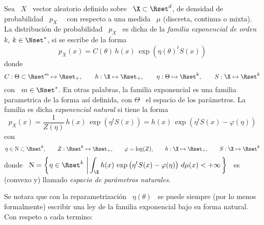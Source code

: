\begin{definicion}\label{Def:MP:FamiliaExponencial}
%
  Sea  \ $X$  \  vector aleatorio  definido  sobre \  $\X  \subset \Rset^d$,  de
  densidad  de probabilidad  \  $p_X$ \  \ con  respecto  a una  medida \  $\mu$
  (discreta, continua o  mixta). La distribuci\'on de probabilidad  \ $p_X$ \ es
  dicha de  la {\em familia  exponencial de orden  $k$}, $k \in \Nset^*$,  si se
  escribe de la forma
  \[
  p_X(x) = C(\theta) \, h(x) \, \exp\left( \eta(\theta)^t S(x) \right)
  \]
  donde
  \[
  C:  \Theta \subset  \Rset^m \mapsto  \Rset_+,  \qquad h:  \X \mapsto  \Rset_+,
  \qquad \eta: \Theta \mapsto \Rset^k, \qquad S: \X \mapsto \Rset^k
  \]
  con  \ $m  \in \Nset^*$.   En otras  palabras, la  familia exponencial  es una
  familia parametrica de  la forma as\'i definida, con $\Theta$  \ el espacio de
  los par\'ametros.  La familia es dicha  {\em exponencial natural}  si tiene la
  forma
  \[
  p_X(x) = \frac{1}{Z(\eta)}  \, h(x) \, \exp\left( \eta^t  S(x) \right) = h(x)
  \, \exp\left( \eta^t S(x) - \varphi(\eta) \right)
  \]
  con
  \[
  \eta \in \mathrm{N} \subset \Rset^k, \qquad Z: \Rset^k \mapsto \Rset_+, \qquad
  \varphi = \log(Z), \qquad h: \X \mapsto \Rset_+, \qquad S: \X \mapsto \Rset^k
  \]
  donde  \ $\displaystyle \mathrm{N}  = \left\{  \eta \in  \Rset^k \,  \left| \,
      \int_\X h(x) \, \exp\left( \eta^t  S(x) - \varphi(\eta) \right) \, d\mu(x)
      < +  \infty \right.  \right\}$ \  es (convexo y)  llamado {\em  espacio de
    par\'ametros naturales}.
\end{definicion}
%
Se notara  que con  la reparametrizaci\'on \  $\eta(\theta)$ \ se  puede siempre
(por lo  menos formalmente) escribir una  ley de la familia  exponencial bajo su
forma natural. Con respeto a cada termino:
%
